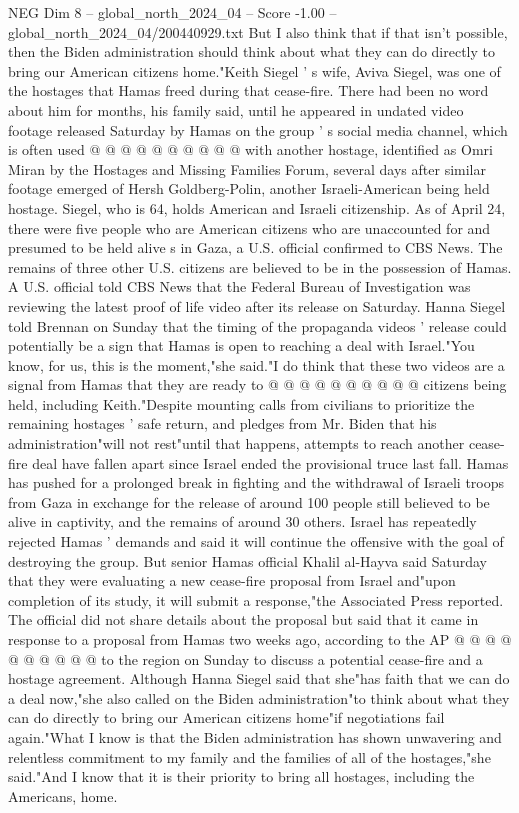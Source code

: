 \begin{textsample}{NEG Dim 8 – global\_north\_2024\_04 – Score -1.00 – global\_north\_2024\_04/200440929.txt}
But I also think that if that isn't possible, then the Biden administration should think about what they can do directly to bring our American citizens home."Keith Siegel ' s wife, Aviva Siegel, was one of the hostages that Hamas freed during that cease-fire.
There had been no word about him for months, his family said, until he appeared in undated video footage released Saturday by Hamas on the group ' s social media channel, which is often used @ @ @ @ @ @ @ @ @ @ with another hostage, identified as Omri Miran by the Hostages and Missing Families Forum, several days after similar footage emerged of Hersh Goldberg-Polin, another Israeli-American being held hostage.
Siegel, who is 64, holds American and Israeli citizenship.
As of April 24, there were five people who are American citizens who are unaccounted for and presumed to be held alive s in Gaza, a U.S. official confirmed to CBS News.
The remains of three other U.S. citizens are believed to be in the possession of Hamas.
A U.S. official told CBS News that the Federal Bureau of Investigation was reviewing the latest proof of life video after its release on Saturday.
Hanna Siegel told Brennan on Sunday that the timing of the propaganda videos ' release could potentially be a sign that Hamas is open to reaching a deal with Israel."You know, for us, this is the moment,"she said."I do think that these two videos are a signal from Hamas that they are ready to @ @ @ @ @ @ @ @ @ @ citizens being held, including Keith."Despite mounting calls from civilians to prioritize the remaining hostages ' safe return, and pledges from Mr.
Biden that his administration"will not rest"until that happens, attempts to reach another cease-fire deal have fallen apart since Israel ended the provisional truce last fall.
Hamas has pushed for a prolonged break in fighting and the withdrawal of Israeli troops from Gaza in exchange for the release of around 100 people still believed to be alive in captivity, and the remains of around 30 others.
Israel has repeatedly rejected Hamas ' demands and said it will continue the offensive with the goal of destroying the group.
But senior Hamas official Khalil al-Hayva said Saturday that they were evaluating a new cease-fire proposal from Israel and"upon completion of its study, it will submit a response,"the Associated Press reported.
The official did not share details about the proposal but said that it came in response to a proposal from Hamas two weeks ago, according to the AP @ @ @ @ @ @ @ @ @ @ to the region on Sunday to discuss a potential cease-fire and a hostage agreement.
Although Hanna Siegel said that she"has faith that we can do a deal now,"she also called on the Biden administration"to think about what they can do directly to bring our American citizens home"if negotiations fail again."What I know is that the Biden administration has shown unwavering and relentless commitment to my family and the families of all of the hostages,"she said."And I know that it is their priority to bring all hostages, including the Americans, home.

\end{textsample}
